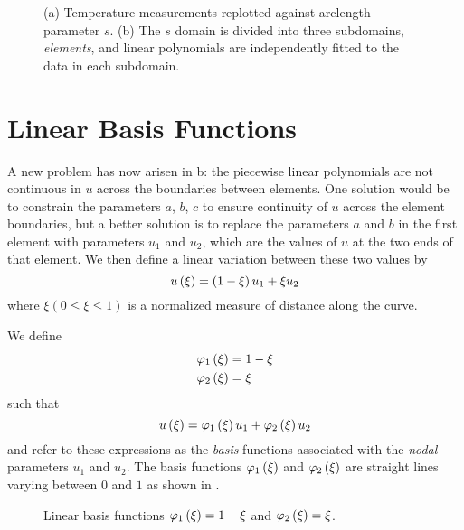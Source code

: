 \begin{figure}[htbp] \centering
  
  \caption{(a) Temperature measurements replotted against arclength 
    parameter $s$. (b) The $s$ domain is divided into three subdomains,
    \emph{elements}, and linear polynomials are independently fitted to the data
    in each subdomain.}
  \label{fig:Tempmeas}
\end{figure}

\section{Linear Basis Functions}

A new
problem has now arisen in b: the piecewise linear
polynomials are not continuous in $u$ across the boundaries between elements.
One solution would be to constrain the parameters $a$, $b$, $c$ \etc to 
ensure continuity of $u$ across the element boundaries, but a better solution 
is to replace the parameters $a$ and $b$ in the first element with parameters
$u_{1}$ and $u_{2}$, which are the values of $u$ at the two ends of that
element. We then define a linear variation between these two values by
\begin{equation*}
   u\left( \xi \right)  = \left( 1-\xi \right)u_{1} + \xi u_{2}
\end{equation*}
where $\xi (0 \leq \xi \leq 1)$ is a normalized measure of distance along the
curve.

We define 
\begin{align*}
       \varphi_{1} \left( \xi \right)   &= 1-\xi  \\ 
       \varphi_{2} \left( \xi \right)   &= \xi
\end{align*}
such that 
\begin{equation*}
   u\left( \xi \right)  =    \varphi_{1} \left( \xi \right)   u_{1} +    \varphi_{2} \left( \xi \right)   u_{2}            
\end{equation*}
and refer to these expressions as the \emph{basis} functions associated with
the \emph{nodal} parameters $u_{1}$ and $u_{2}$. The basis functions
$   \varphi_{1} \left( \xi \right)  $ and $   \varphi_{2} \left( \xi \right)  $ are straight lines varying between $0$ and $1$
as shown in .

\begin{figure}[htbp] \centering
  
  \caption{Linear basis functions $   \varphi_{1} \left( \xi \right)  =1-\xi$ and 
    $   \varphi_{2} \left( \xi \right)  =\xi$.}
  \label{fig:Linearbf}
\end{figure}
   
